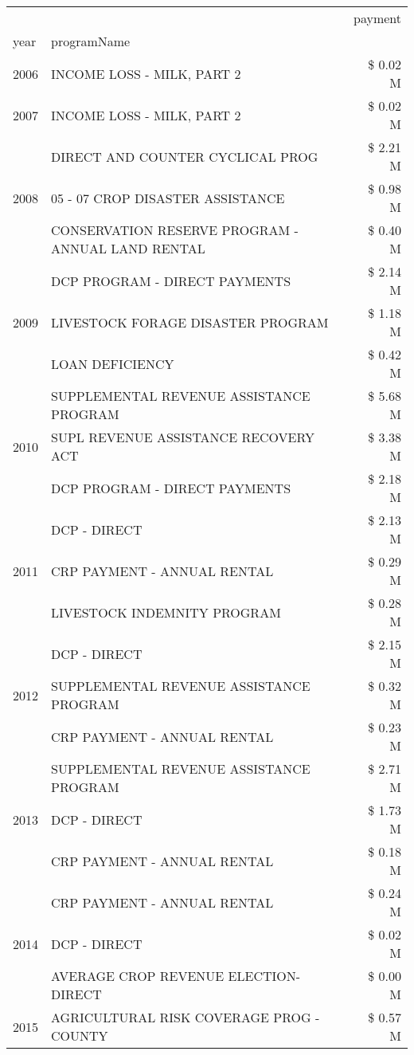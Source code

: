 \begin{tabular}{llr}
\toprule
 &  & payment \\
year & programName &  \\
\midrule
2006 & INCOME LOSS - MILK, PART 2 & \$ 0.02 M \\
\cline{1-3}
2007 & INCOME LOSS - MILK, PART 2 & \$ 0.02 M \\
\cline{1-3}
\multirow[t]{3}{*}{2008} & DIRECT AND COUNTER CYCLICAL PROG & \$ 2.21 M \\
 & 05 - 07 CROP DISASTER ASSISTANCE & \$ 0.98 M \\
 & CONSERVATION RESERVE PROGRAM - ANNUAL LAND RENTAL & \$ 0.40 M \\
\cline{1-3}
\multirow[t]{3}{*}{2009} & DCP PROGRAM - DIRECT PAYMENTS & \$ 2.14 M \\
 & LIVESTOCK FORAGE DISASTER  PROGRAM & \$ 1.18 M \\
 & LOAN DEFICIENCY & \$ 0.42 M \\
\cline{1-3}
\multirow[t]{3}{*}{2010} & SUPPLEMENTAL REVENUE ASSISTANCE PROGRAM & \$ 5.68 M \\
 & SUPL REVENUE ASSISTANCE RECOVERY ACT & \$ 3.38 M \\
 & DCP PROGRAM - DIRECT PAYMENTS & \$ 2.18 M \\
\cline{1-3}
\multirow[t]{3}{*}{2011} & DCP - DIRECT & \$ 2.13 M \\
 & CRP PAYMENT - ANNUAL RENTAL & \$ 0.29 M \\
 & LIVESTOCK INDEMNITY PROGRAM & \$ 0.28 M \\
\cline{1-3}
\multirow[t]{3}{*}{2012} & DCP - DIRECT & \$ 2.15 M \\
 & SUPPLEMENTAL REVENUE ASSISTANCE PROGRAM & \$ 0.32 M \\
 & CRP PAYMENT - ANNUAL RENTAL & \$ 0.23 M \\
\cline{1-3}
\multirow[t]{3}{*}{2013} & SUPPLEMENTAL REVENUE ASSISTANCE PROGRAM & \$ 2.71 M \\
 & DCP - DIRECT & \$ 1.73 M \\
 & CRP PAYMENT - ANNUAL RENTAL & \$ 0.18 M \\
\cline{1-3}
\multirow[t]{3}{*}{2014} & CRP PAYMENT - ANNUAL RENTAL & \$ 0.24 M \\
 & DCP - DIRECT & \$ 0.02 M \\
 & AVERAGE CROP REVENUE ELECTION-DIRECT & \$ 0.00 M \\
\cline{1-3}
\multirow[t]{3}{*}{2015} & AGRICULTURAL RISK COVERAGE PROG - COUNTY & \$ 0.57 M \\

\end{tabular}
